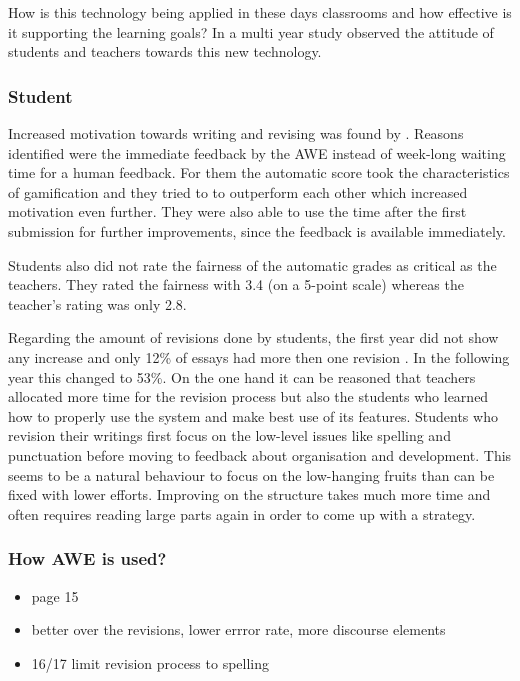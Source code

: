 \documentclass[runningheads]{llncs}
\begin{document}
How is this technology being applied in these days classrooms and how effective is it supporting the learning goals? In a multi year study \textcite{grimes_utility_2010} observed the attitude of students and teachers towards this new technology. 

\subsubsection{Student}
Increased motivation towards writing and revising was found by \textcite{grimes_utility_2010}. Reasons identified were the immediate feedback by the AWE instead of week-long waiting time for a human feedback. For them the automatic score took the characteristics of gamification and they tried to to outperform each other which increased motivation even further. They were also able to use the time after the first submission for further improvements, since the feedback is available immediately.

Students also did not rate the fairness of the automatic grades as critical as the teachers. They rated the fairness with 3.4 (on a 5-point scale) whereas the teacher's rating was only 2.8.

Regarding the amount of revisions done by students, the first year did not show any increase and only 12\% of essays had more then one revision \citep{grimes_utility_2010}. In the following year this changed to 53\%. On the one hand it can be reasoned that teachers allocated more time for the revision process but also the students who learned how to properly use the system and make best use of  its features.   Students who revision their writings first focus on the low-level issues like spelling and punctuation before moving to feedback about organisation and development. This seems to be a natural behaviour to focus on the low-hanging fruits than can be fixed with lower efforts. Improving on the structure takes much more time and often requires reading large parts again in order to come up with a strategy.

\subsubsection{How AWE is used?}



\begin{itemize}
 \item \citep{warschauer_automated_2006} page 15
 \item better over the revisions, lower errror rate, more discourse elements
 \item 16/17 limit revision process to spelling 
\end{itemize}
\end{document}
